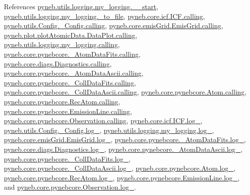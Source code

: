 References \hyperlink{logging_8py_source_l00042}{pyneb.\+utils.\+logging.\+my\+\_\+logging.\+\_\+\+\_\+start}, \hyperlink{logging_8py_source_l00179}{pyneb.\+utils.\+logging.\+my\+\_\+logging.\+\_\+to\+\_\+file}, \hyperlink{icf_8py_source_l00016}{pyneb.\+core.\+icf.\+I\+C\+F.\+calling}, \hyperlink{_config_8py_source_l00032}{pyneb.\+utils.\+Config.\+\_\+\+Config.\+calling}, \hyperlink{emis_grid_8py_source_l00041}{pyneb.\+core.\+emis\+Grid.\+Emis\+Grid.\+calling}, \hyperlink{plot_atomic_data_8py_source_l00042}{pyneb.\+plot.\+plot\+Atomic\+Data.\+Data\+Plot.\+calling}, \hyperlink{logging_8py_source_l00044}{pyneb.\+utils.\+logging.\+my\+\_\+logging.\+calling}, \hyperlink{pynebcore_8py_source_l00090}{pyneb.\+core.\+pynebcore.\+\_\+\+Atom\+Data\+Fits.\+calling}, \hyperlink{diags_8py_source_l00169}{pyneb.\+core.\+diags.\+Diagnostics.\+calling}, \hyperlink{pynebcore_8py_source_l00311}{pyneb.\+core.\+pynebcore.\+\_\+\+Atom\+Data\+Ascii.\+calling}, \hyperlink{pynebcore_8py_source_l00568}{pyneb.\+core.\+pynebcore.\+\_\+\+Coll\+Data\+Fits.\+calling}, \hyperlink{pynebcore_8py_source_l00918}{pyneb.\+core.\+pynebcore.\+\_\+\+Coll\+Data\+Ascii.\+calling}, \hyperlink{pynebcore_8py_source_l01175}{pyneb.\+core.\+pynebcore.\+Atom.\+calling}, \hyperlink{pynebcore_8py_source_l02572}{pyneb.\+core.\+pynebcore.\+Rec\+Atom.\+calling}, \hyperlink{pynebcore_8py_source_l03263}{pyneb.\+core.\+pynebcore.\+Emission\+Line.\+calling}, \hyperlink{pynebcore_8py_source_l03419}{pyneb.\+core.\+pynebcore.\+Observation.\+calling}, \hyperlink{icf_8py_source_l00015}{pyneb.\+core.\+icf.\+I\+C\+F.\+log\+\_\+}, \hyperlink{_config_8py_source_l00031}{pyneb.\+utils.\+Config.\+\_\+\+Config.\+log\+\_\+}, \hyperlink{logging_8py_source_l00033}{pyneb.\+utils.\+logging.\+my\+\_\+logging.\+log\+\_\+}, \hyperlink{emis_grid_8py_source_l00040}{pyneb.\+core.\+emis\+Grid.\+Emis\+Grid.\+log\+\_\+}, \hyperlink{pynebcore_8py_source_l00080}{pyneb.\+core.\+pynebcore.\+\_\+\+Atom\+Data\+Fits.\+log\+\_\+}, \hyperlink{diags_8py_source_l00168}{pyneb.\+core.\+diags.\+Diagnostics.\+log\+\_\+}, \hyperlink{pynebcore_8py_source_l00301}{pyneb.\+core.\+pynebcore.\+\_\+\+Atom\+Data\+Ascii.\+log\+\_\+}, \hyperlink{pynebcore_8py_source_l00557}{pyneb.\+core.\+pynebcore.\+\_\+\+Coll\+Data\+Fits.\+log\+\_\+}, \hyperlink{pynebcore_8py_source_l00906}{pyneb.\+core.\+pynebcore.\+\_\+\+Coll\+Data\+Ascii.\+log\+\_\+}, \hyperlink{pynebcore_8py_source_l01162}{pyneb.\+core.\+pynebcore.\+Atom.\+log\+\_\+}, \hyperlink{pynebcore_8py_source_l02562}{pyneb.\+core.\+pynebcore.\+Rec\+Atom.\+log\+\_\+}, \hyperlink{pynebcore_8py_source_l03262}{pyneb.\+core.\+pynebcore.\+Emission\+Line.\+log\+\_\+}, and \hyperlink{pynebcore_8py_source_l03418}{pyneb.\+core.\+pynebcore.\+Observation.\+log\+\_\+}.


